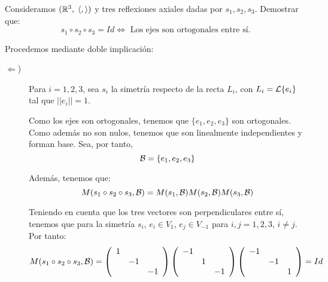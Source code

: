 \begin{ejercicio}
    Consideramos $(\mathbb{R}^3, \;\langle , \rangle)$ y tres reflexiones axiales dadas por $s_1,s_2,s_3$. Demostrar que:
    \begin{equation*}
        s_1\circ s_2\circ s_3 = Id \Longleftrightarrow
        \text{ Los ejes son ortogonales entre sí.}
    \end{equation*}

    Procedemos mediante doble implicación:
    \begin{description}
        \item [$\Longleftarrow$)]

        Para $i=1,2,3$, sea $s_i$ la simetría respecto de la recta $L_i$, con $L_i=\mathcal{L}\{e_i\}$ tal que $||e_i||=1$.

        Como los ejes son ortogonales, tenemos que $\{e_1,e_2, e_3\}$ son ortogonales. Como además no son nulos, tenemos que son linealmente independientes y forman base. Sea, por tanto,
        \begin{equation*}
            \mathcal{B}=\{e_1,e_2, e_3\}  
        \end{equation*}

        Además, tenemos que:
        \begin{equation*}
            M(s_1\circ s_2 \circ s_3, \mathcal{B})
            = M(s_1, \mathcal{B})
            M(s_2, \mathcal{B})
            M(s_3, \mathcal{B})
        \end{equation*}

        Teniendo en cuenta que los tres vectores son perpendiculares entre sí, tenemos que para la simetría $s_i$, $e_i\in V_1$, $e_j\in V_{-1}$ para $i,j=1,2,3$, $i\neq j$. Por tanto:
        \begin{equation*}
            M(s_1\circ s_2 \circ s_3, \mathcal{B})=
            \left(\begin{array}{ccc}
                1 &  \\
                 & -1 \\
                 && -1
            \end{array}\right)
            \left(\begin{array}{ccc}
                -1 &  \\
                 & 1 \\
                 && -1
            \end{array}\right)
            \left(\begin{array}{ccc}
                -1 &  \\
                 & -1 \\
                 && 1
            \end{array}\right) = Id
        \end{equation*}


\end{description}
\end{ejercicio}
